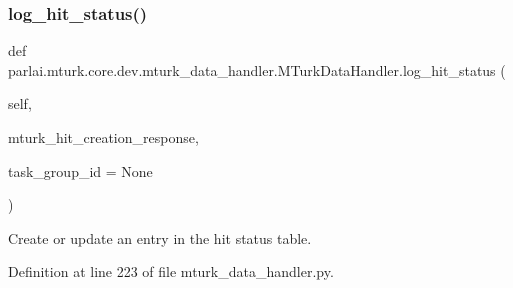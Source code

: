 \subsubsection{\texorpdfstring{log\+\_\+hit\+\_\+status()}{log\_hit\_status()}}
{\footnotesize\ttfamily def parlai.\+mturk.\+core.\+dev.\+mturk\+\_\+data\+\_\+handler.\+M\+Turk\+Data\+Handler.\+log\+\_\+hit\+\_\+status (\begin{DoxyParamCaption}\item[{}]{self,  }\item[{}]{mturk\+\_\+hit\+\_\+creation\+\_\+response,  }\item[{}]{task\+\_\+group\+\_\+id = {\ttfamily None} }\end{DoxyParamCaption})}

\begin{DoxyVerb}Create or update an entry in the hit status table.
\end{DoxyVerb}
 

Definition at line 223 of file mturk\+\_\+data\+\_\+handler.\+py.


